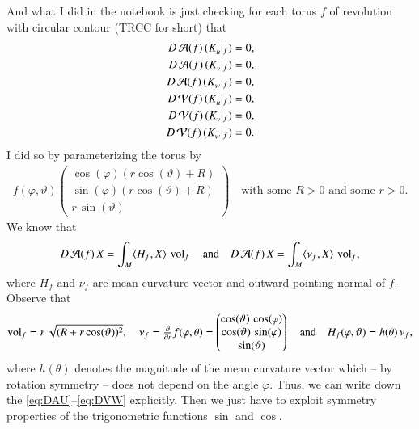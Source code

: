 {And what I did in the notebook is just checking for each torus $f$ of revolution with circular contour (TRCC for short) that
\begin{align}
	D \Area(f) \,(\Funda[u] \at_f) &= 0, \label{eq:DAU}
	\\
	D \Area(f) \,(\Funda[v] \at_f) &= 0, \label{eq:DAV}
	\\
	D \Area(f) \,(\Funda[w] \at_f) &= 0, \label{eq:DAW}
	\\
	D \Volume(f) \,(\Funda[u] \at_f) &= 0,  \label{eq:DVU}
	\\
	D \Volume(f) \,(\Funda[v] \at_f) &= 0,  \label{eq:DVV}
	\\
	D \Volume(f) \,(\Funda[w] \at_f) &= 0.  \label{eq:DVW}
\end{align}
I did so by parameterizing the torus by
\begin{align*}
	f( \varphi , \vartheta)
	\begin{pmatrix}
		\cos (\varphi ) (r \cos (\vartheta )+R)
		\\
		\sin (\varphi ) (r \cos (\vartheta )+R)
		\\
		r \,  \sin (\vartheta )
	\end{pmatrix}
	\quad
	\text{with some $R>0$ and some $r>0$.}
\end{align*}
We know that
\begin{align*}
	D\operatorname{\mathcal{A}}(f) \, X
	=
	\int_M \langle H_f, X \rangle\, \operatorname{vol}_f
	\quad \text{and} \quad
	D\operatorname{\mathcal{A}}(f) \, X
	=
	\int_M \langle \nu_f, X \rangle\, \operatorname{vol}_f	,
\end{align*}
where $H_f$ and $\nu_f$ are mean curvature vector and outward pointing normal of $f$.
Observe that
\begin{align*}
	\operatorname{vol}_f = r \, \sqrt{(R + r \cos(\vartheta))^2},
	\quad
	\nu_f = \tfrac{\partial}{\partial r} f(\varphi,\theta) = 
	\begin{pmatrix}
		\cos(\vartheta ) \, \cos (\varphi)
		\\
		\cos(\vartheta) \, \sin(\varphi)
		\\
		\sin(\vartheta)
	\end{pmatrix}
	\quad \text{and} \quad
	H_f(\varphi,\vartheta) = h(\theta) \, \nu_f
	,
\end{align*}
where $h(\theta)$ denotes the magnitude of the mean curvature vector which -- by rotation symmetry -- does not depend on the angle $\varphi$.
Thus, we can write down the \eqref{eq:DAU}--\eqref{eq:DVW} explicitly.
Then we just have to exploit symmetry properties of the trigonometric functions $\sin$ and $\cos$.

\bigskip

}
